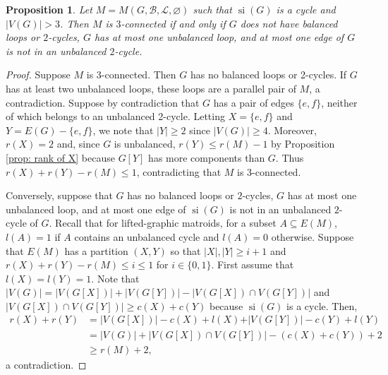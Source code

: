 \documentclass[12pt]{article}
\newtheorem{proposition}[theorem]{Proposition}
\theoremstyle{definition}
\theoremstyle{plain} %
\newcommand{\cB}{\mathcal{B}}
\newcommand{\cL}{\mathcal{L}}
\DeclareMathOperator{\si}{si}
\begin{document}
\begin{proposition} \label{lem: at most one edge of $M$ is not in an unbalanced $2$-cycle}
    Let $M=M(G, \cB, \cL, \varnothing)$ such that $\si(G)$ is a cycle and $|V(G)| > 3$. Then $M$ is $3$-connected if and only if $G$ does not have balanced loops or $2$-cycles, $G$ has at most one unbalanced loop, and at most one edge of $G$ is not in an unbalanced $2$-cycle.
\end{proposition}
\begin{proof}
    Suppose $M$ is 3-connected. Then $G$ has no balanced loops or 2-cycles. If $G$ has at least two unbalanced loops, these loops are a parallel pair of $M$, a contradiction. Suppose by contradiction that $G$ has a pair of edges $\{e,f\}$, neither of which belongs to an unbalanced 2-cycle. Letting $X=\{e,f\}$ and $Y=E(G)-\{e,f\}$, we note that $\lvert Y\rvert\geq2$ since $\lvert V(G)\rvert\geq4$. Moreover, $r(X)=2$ and, since $G$ is unbalanced, $r(Y)\leq r(M)-1$ by Proposition \ref{prop: rank of X} because $G[Y]$ has more components than $G$. Thus $r(X)+r(Y)-r(M)\leq1$, contradicting that $M$ is 3-connected. 

    Conversely, suppose that $G$ has no balanced loops or $2$-cycles, $G$ has at most one unbalanced loop, and at most one edge of $\si(G)$ is not in an unbalanced $2$-cycle of $G$. Recall that for lifted-graphic matroids, for a subset $A\subseteq E(M)$, $l(A)=1$ if $A$ contains an unbalanced cycle and $l(A)=0$ otherwise. Suppose that $E(M)$ has a partition $(X,Y)$ so that $\lvert X\rvert,\lvert Y\rvert\geq i+1$ and $r(X)+r(Y)-r(M)\leq i\leq1$ for $i\in\{0,1\}$. First assume that $l(X)=l(Y)=1$. Note that $\lvert V(G)\rvert=\lvert V(G[X])\rvert+\lvert V(G[Y])\rvert-\lvert V(G[X])\cap V(G[Y])\rvert$ and $\lvert V(G[X])\cap V(G[Y])\rvert \geq c(X)+c(Y)$ because $\si(G)$ is a cycle. Then, 
    \begin{align*}
        r(X)+r(Y)&=\lvert V(G[X])\rvert-c(X)+l(X)+\rvert V(G[Y])\rvert-c(Y)+l(Y)\\
        &=\lvert V(G)\rvert + \lvert V(G[X])\cap V(G[Y])\rvert-(c(X)+c(Y))+2\\
        &\geq r(M)+2,
    \end{align*}
    a contradiction.


\end{proof}
\end{document}
